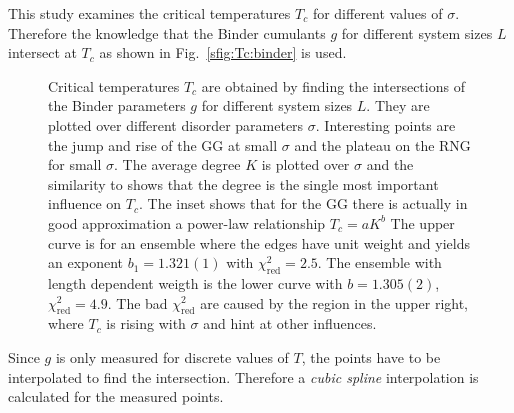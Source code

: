 \documentclass[pre,twocolumn,groupedaddress,showpacs,showkeys,amsmath,amssymb,floatfix]{revtex4-1}
\begin{document}
        This study examines the critical temperatures $T_c$ for different values of $\sigma$.
        Therefore the knowledge that the Binder cumulants $g$ for different
        system sizes $L$ intersect at $T_c$ \cite{Binder1981} as shown in Fig.~\ref{sfig:Tc:binder}
        is used.
        \begin{figure}[hbtp]
            \caption[Critical Temperature over Different Disorder Parameters]
            {
                 Critical temperatures \(T_c\) are obtained by finding the intersections
                of the Binder parameters $g$ for different system sizes $L$.
                 They are plotted over different disorder parameters \(\sigma\).
                Interesting points are the jump and rise of the GG at small
                \(\sigma\) and the plateau on the RNG for small \(\sigma\).
                 The average degree \(K\) is plotted over $\sigma$ and
                the similarity to  shows that the degree is the single
                most important influence on $T_c$. The inset shows that for the GG there
                is actually in good approximation a power-law relationship \(T_c = aK^b\)
                The upper curve is for an ensemble where the edges have unit weight and
                yields an exponent $b_1=1.321(1)$ with $\chi_{\mathrm{red}}^2 = 2.5$.
                The ensemble with length dependent weigth is the lower curve with
                $b = 1.305(2)$, $\chi_{\mathrm{red}}^2 = 4.9$.
                The bad $\chi_\mathrm{red}^2$ are caused by the region in the upper right,
                where $T_c$ is rising with $\sigma$ and hint at other influences.
            }
            \label{fig:Tc}
        \end{figure}
        Since \(g\) is only measured for discrete values of \(T\),
        the points have to be interpolated to find the intersection. Therefore
        a \emph{cubic spline} \cite{press2007numerical} interpolation %
        is calculated for the measured points.
\end{document}
